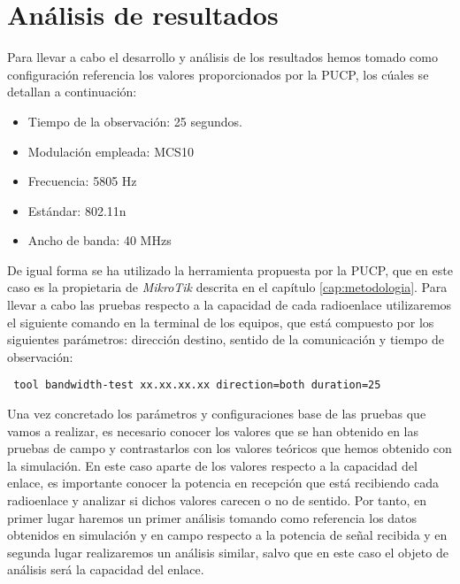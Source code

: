 \section{Análisis de resultados}
Para llevar a cabo el desarrollo y análisis de los resultados hemos tomado como configuración referencia los valores proporcionados por la PUCP, los cúales se detallan a continuación:
\begin{itemize}
	\item Tiempo de la observación: 25 segundos.
	\item Modulación empleada: MCS10
	\item Frecuencia: 5805 Hz
	\item Estándar: 802.11n
	\item Ancho de banda: 40 MHzs
\end{itemize}
De igual forma se ha utilizado la herramienta propuesta por la PUCP, que en este caso es la propietaria de \textit{MikroTik} descrita en el capítulo \ref{cap:metodologia}. Para llevar a cabo las pruebas respecto a la capacidad de cada radioenlace  utilizaremos el siguiente comando en la terminal de los equipos, que está compuesto por los siguientes parámetros: dirección destino, sentido de la comunicación y tiempo de observación:
\begin{lstlisting}
 tool bandwidth-test xx.xx.xx.xx direction=both duration=25
\end{lstlisting}

Una vez concretado los parámetros y configuraciones base de las pruebas que vamos a realizar, es necesario conocer los valores que se han obtenido en las pruebas de campo y contrastarlos con los valores teóricos que hemos obtenido con la simulación. En este caso aparte de los valores respecto a la capacidad del enlace, es importante conocer la potencia en recepción que está recibiendo cada radioenlace y analizar si dichos valores carecen o no de sentido. Por tanto, en primer lugar haremos un primer análisis tomando como referencia los datos obtenidos en simulación y en campo respecto a la potencia de señal recibida y en segunda lugar realizaremos un análisis similar, salvo que en este caso el objeto de análisis será la capacidad del enlace.\\\\

